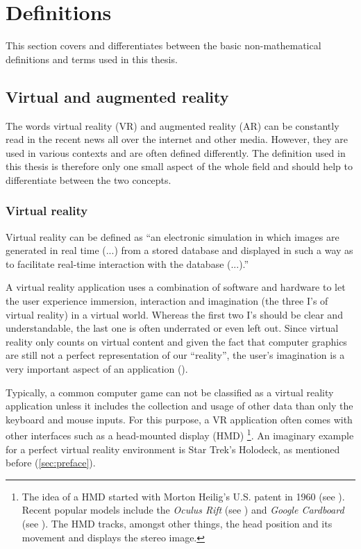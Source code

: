 \section{Definitions}
This section covers and differentiates between the basic non-mathematical definitions and terms used in this thesis.

\subsection{Virtual and augmented reality}\label{sec:VAR}
The words virtual reality (VR) and augmented reality (AR) can be constantly read in the recent news all over the internet and other media. However, they are used in various contexts and are often defined differently. The definition used in this thesis is therefore only one small aspect of the whole field and should help to differentiate between the two concepts. 
\subsubsection{Virtual reality}
Virtual reality can be defined as \enquote{an electronic simulation in which images are generated in real time (...) from a stored database and displayed in such a way as to facilitate real-time interaction with the database (...).} \cite[p.148]{Latham.1995}

A virtual reality application uses a combination of software and hardware to let the user experience immersion, interaction and imagination (the three I's of virtual reality) in a virtual world. Whereas the first two I's should be clear and understandable, the last one is often underrated or even left out. Since virtual reality only counts on virtual content and given the fact that computer graphics are still not a perfect representation of our \enquote{reality}, the user's imagination is a very important aspect of an application (\cite[p.3 et seq.]{Burdea.2003}).

Typically, a common computer game can not be classified as a virtual reality application unless it includes the collection and usage of other data than only the keyboard and mouse inputs. For this purpose, a VR application often comes with other interfaces such as a head-mounted display (HMD) \footnote{The idea of a HMD started with Morton Heilig's   U.S. patent in 1960 (see \cite{Heilig.1957}). Recent popular models include the \textit{Oculus Rift} (see \cite{Oculus.2016}) and \textit{Google Cardboard} (see \cite{GoogleDev.2016}). The HMD tracks, amongst other things, the head position and its movement and displays the stereo image.}. An imaginary example for a perfect virtual reality environment is Star Trek's Holodeck, as mentioned before (\autoref{sec:preface}).

